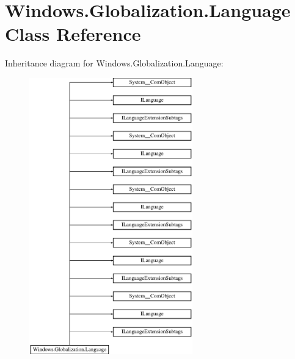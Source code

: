 \hypertarget{class_windows_1_1_globalization_1_1_language}{}\section{Windows.\+Globalization.\+Language Class Reference}
\label{class_windows_1_1_globalization_1_1_language}
Inheritance diagram for Windows.\+Globalization.\+Language\+:\begin{figure}[H]
\begin{center}
\leavevmode
\includegraphics[height=12.000000cm]{class_windows_1_1_globalization_1_1_language}
\end{center}
\end{figure}
